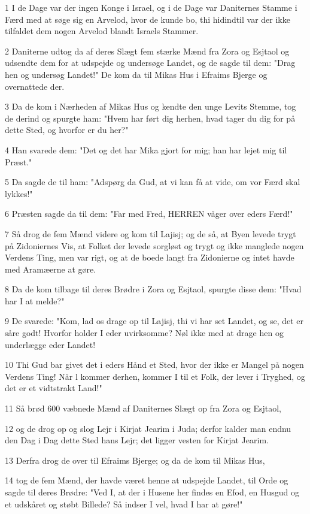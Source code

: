 \par 1 I de Dage var der ingen Konge i Israel, og i de Dage var Daniternes Stamme i Færd med at søge sig en Arvelod, hvor de kunde bo, thi hidindtil var der ikke tilfaldet dem nogen Arvelod blandt Israels Stammer.
\par 2 Daniterne udtog da af deres Slægt fem stærke Mænd fra Zora og Esjtaol og udsendte dem for at udspejde og undersøge Landet, og de sagde til dem: "Drag hen og undersøg Landet!" De kom da til Mikas Hus i Efraims Bjerge og overnattede der.
\par 3 Da de kom i Nærheden af Mikas Hus og kendte den unge Levits Stemme, tog de derind og spurgte ham: "Hvem har ført dig herhen, hvad tager du dig for på dette Sted, og hvorfor er du her?"
\par 4 Han svarede dem: "Det og det har Mika gjort for mig; han har lejet mig til Præst."
\par 5 Da sagde de til ham: "Adspørg da Gud, at vi kan få at vide, om vor Færd skal lykkes!"
\par 6 Præsten sagde da til dem: "Far med Fred, HERREN våger over eders Færd!"
\par 7 Så drog de fem Mænd videre og kom til Lajisj; og de så, at Byen levede trygt på Zidoniernes Vis, at Folket der levede sorgløst og trygt og ikke manglede nogen Verdens Ting, men var rigt, og at de boede langt fra Zidonierne og intet havde med Aramæerne at gøre.
\par 8 Da de kom tilbage til deres Brødre i Zora og Esjtaol, spurgte disse dem: "Hvad har I at melde?"
\par 9 De svarede: "Kom, lad os drage op til Lajisj, thi vi har set Landet, og se, det er såre godt! Hvorfor holder I eder uvirksomme? Nøl ikke med at drage hen og underlægge eder Landet!
\par 10 Thi Gud bar givet det i eders Hånd et Sted, hvor der ikke er Mangel på nogen Verdens Ting! Når l kommer derhen, kommer I til et Folk, der lever i Tryghed, og det er et vidtstrakt Land!"
\par 11 Så brød 600 væbnede Mænd af Daniternes Slægt op fra Zora og Esjtaol,
\par 12 og de drog op og slog Lejr i Kirjat Jearim i Juda; derfor kalder man endnu den Dag i Dag dette Sted hans Lejr; det ligger vesten for Kirjat Jearim.
\par 13 Derfra drog de over til Efraims Bjerge; og da de kom til Mikas Hus,
\par 14 tog de fem Mænd, der havde været henne at udspejde Landet, til Orde og sagde til deres Brødre: "Ved I, at der i Husene her findes en Efod, en Husgud og et udskåret og støbt Billede? Så indser I vel, hvad I har at gøre!"

